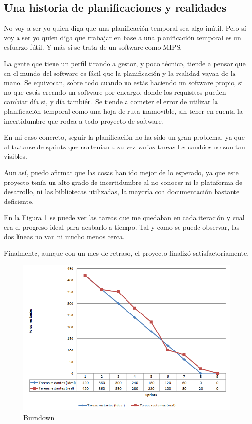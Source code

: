 \subsection{Una historia de planificaciones y realidades}
No voy a ser yo quien diga que una planificaci\'on temporal sea algo in\'util.
Pero s\'i voy a ser yo quien diga que trabajar en base a una planificaci\'on 
temporal es
un esfuerzo f\'util. Y m\'as si se trata de un software como MIPS.

La gente que tiene un perfil tirando a gestor, y poco t\'ecnico, tiende a pensar
que en el mundo del software es f\'acil que la planificaci\'on y la realidad
vayan de la mano. Se equivocan, sobre todo cuando no est\'as haciendo un software propio,
si no que est\'as creando un software por encargo, donde los requisitos pueden
cambiar d\'ia si, y d\'ia tambi\'en. Se tiende a cometer el error de utilizar la planificaci\'on
temporal como una hoja de ruta inamovible, sin tener en cuenta la incertidumbre que rodea
a todo proyecto de software.

En mi caso concreto, seguir la planificaci\'on no ha sido un gran problema, ya que al tratarse
de sprints que conten\'ian a su vez varias tareas los cambios no son tan visibles.

Aun as\'i, puedo afirmar que las cosas han ido mejor de lo esperado, ya que este proyecto
ten\'ia un alto grado de incertidumbre al no conocer ni la plataforma de desarrollo, ni las
bibliotecas utilizadas, la mayor\'ia con documentaci\'on bastante deficiente.

En la Figura \ref{fig:burndown} se puede ver las tareas que me quedaban en cada iteraci\'on
y cual era el progreso ideal para acabarlo a tiempo. Tal y como se puede observar,
las dos l\'ineas no van ni mucho menos cerca.

Finalmente, aunque con un mes de retraso, el proyecto finaliz\'o satisfactoriamente.

\begin{figure}[h]
    \centering
    \includegraphics[width=1.0\linewidth]{./Figures/burndown.png}
    \caption{Burndown}
    \label{fig:burndown}
\end{figure}

